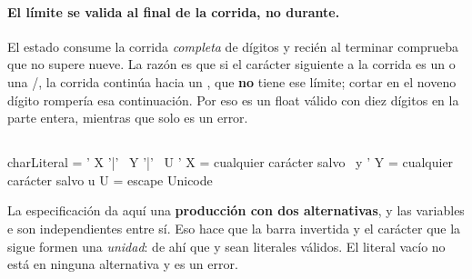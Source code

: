 \documentclass[11pt,a4paper]{article}
\begin{document}
\begin{center}
\end{center}

\paragraph{El límite se valida al final de la corrida, no durante.} El estado consume la corrida
\emph{completa} de dígitos y recién al terminar comprueba que no supere nueve. La razón es que si el
carácter siguiente a la corrida es un  o una /, la corrida continúa hacia un
, que \textbf{no} tiene ese límite; cortar en el noveno dígito rompería esa
continuación. Por eso  es un float válido con diez dígitos en la parte entera,
mientras que  solo es un error.

\subsection{}
\label{sec:char}

\begin{er}
charLiteral = ' X '\quad|\quad' \bs\ Y '\quad|\quad' \bs\ U '
\medskip
X = cualquier carácter salvo \bs\ y '
Y = cualquier carácter salvo u
U = escape Unicode
\end{er}

La especificación da aquí una \textbf{producción con dos alternativas}, y las variables  e
 son independientes entre sí. Eso hace que la barra invertida y el carácter que la sigue
formen una \emph{unidad}: de ahí que  y  sean literales válidos. El literal
vacío  no está en ninguna alternativa y es un error.
\end{document}
